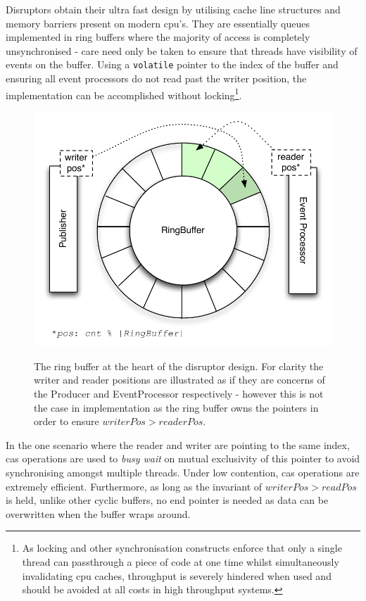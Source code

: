 \documentclass[a4paper,11pt]{scrreprt}
\begin{document}
Disruptors obtain their ultra fast design by utilising cache line structures and memory barriers present on modern \acrshort{cpu}'s. They are essentially queues implemented in ring buffers where the majority of access is completely unsynchronised - care need only be taken to ensure that threads have visibility of events on the buffer. Using a \texttt{volatile} pointer to the index of the buffer and ensuring all event processors do not read past the writer position, the implementation can be accomplished without locking\footnote{As locking and other synchronisation constructs enforce that only a single thread can passthrough a piece of code at one time whilst simultaneously invalidating \acrshort{cpu} caches, throughput is severely hindered when used and should be avoided at all costs in high throughput systems.}. 
\begin{figure}[h]
\centering
\caption{The ring buffer at the heart of the disruptor design. For clarity the writer and reader positions are illustrated as if they are concerns of the Producer and EventProcessor respectively - however this is not the case in implementation as the ring buffer owns the pointers in order to ensure \(writerPos > readerPos\).}
\includegraphics[scale=0.65, trim=0 10 0 0, clip=true] {ringbuffer.pdf}
\label{fig:ringbuffer}
\end{figure}

In the one scenario where the reader and writer are pointing to the same index, \acrshort{cas} operations are used to \textit{busy wait} on mutual exclusivity of this pointer to avoid synchronising amongst multiple threads. Under low contention, \acrshort{cas} operations are extremely efficient. Furthermore, as long as the invariant of \(writerPos > readPos\) is held, unlike other cyclic buffers, no end pointer is needed as data can be overwritten when the buffer wraps around.
\end{document}
